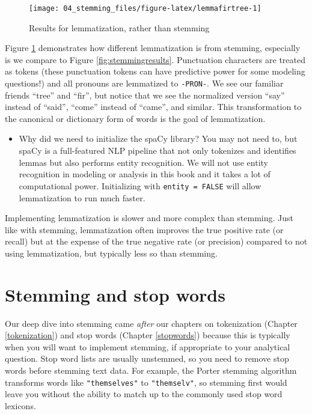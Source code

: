 \documentclass[
]{krantz}
\newenvironment{rmdblock}[1]
  {\begin{shaded*}
  \begin{itemize}[left = -1cm, labelsep = 1cm]
  \renewcommand{\labelitemi}{
    \raisebox{-.7\height}[0pt][0pt]{
      {\setkeys{Gin}{width=3em,keepaspectratio}\texttt{[image: images/\#1]}}
    }
  }
 
  \item
  }
  {
  \end{itemize}
  \end{shaded*}
  }
\newenvironment{rmdnote}
  {\begin{rmdblock}{note}}
  {\end{rmdblock}}
\begin{document}
\begin{figure}

{\centering \texttt{[image: 04\_stemming\_files/figure-latex/lemmafirtree-1]} 

}

\caption{Results for lemmatization, rather than stemming}\label{fig:lemmafirtree}
\end{figure}

Figure \ref{fig:lemmafirtree} demonstrates how different lemmatization is from stemming, especially is we compare to Figure \ref{fig:stemmingresults}. Punctuation characters are treated as tokens (these punctuation tokens can have predictive power for some modeling questions!) and all pronouns are lemmatized to \texttt{-PRON-}. We see our familiar friends ``tree'' and ``fir'', but notice that we see the normalized version ``say'' instead of ``said'', ``come'' instead of ``came'', and similar. This transformation to the canonical or dictionary form of words is the goal of lemmatization.

\begin{rmdnote}
Why did we need to initialize the spaCy library? You may not need to,
but spaCy is a full-featured NLP pipeline that not only tokenizes and
identifies lemmas but also performs entity recognition. We will not use
entity recognition in modeling or analysis in this book and it takes a
lot of computational power. Initializing with \texttt{entity\ =\ FALSE}
will allow lemmatization to run much faster.
\end{rmdnote}

Implementing lemmatization is slower and more complex than stemming. Just like with stemming, lemmatization often improves the true positive rate (or recall) but at the expense of the true negative rate (or precision) compared to not using lemmatization, but typically less so than stemming.

\hypertarget{stemming-and-stop-words}{%
\section{Stemming and stop words}\label{stemming-and-stop-words}}

Our deep dive into stemming came \emph{after} our chapters on tokenization (Chapter \ref{tokenization}) and stop words (Chapter \ref{stopwords}) because this is typically when you will want to implement stemming, if appropriate to your analytical question. Stop word lists are usually unstemmed, so you need to remove stop words before stemming text data. For example, the Porter stemming algorithm transforms words like \texttt{"themselves"} to \texttt{"themselv"}, so stemming first would leave you without the ability to match up to the commonly used stop word lexicons.
\end{document}
